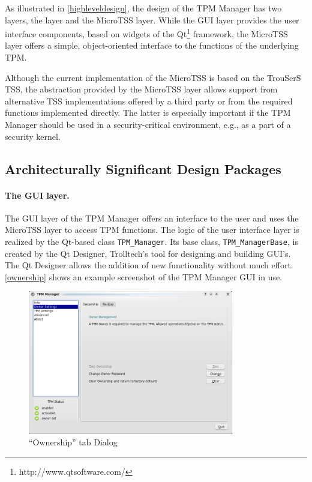 \documentclass[
  american        %
]{sirrixreport}
\begin{document}
As illustrated in \autoref{highleveldesign}, the design of the TPM Manager has two layers, the \GUI layer and the MicroTSS layer.
While the GUI layer provides the user interface components, based on widgets of the Qt\footnote{http://www.qtsoftware.com/} framework, the MicroTSS layer offers a simple, object-oriented interface to the functions
of the underlying TPM.


Although the current implementation of the MicroTSS is based on the TrouSerS TSS, the abstraction provided by the MicroTSS layer allows support from alternative
TSS implementations offered by a third party or from the required functions implemented directly.
The latter is especially important if the TPM Manager should be used in a security-critical
environment, e.g., as a part of a security kernel.


\subsection{Architecturally Significant Design Packages}


\paragraph{The GUI layer.}
The GUI layer of the TPM Manager offers an interface to the user and uses
the MicroTSS layer to access TPM functions. The logic of the user interface layer is realized by
the Qt-based class \lstinline'TPM_Manager'. Its base class, \lstinline'TPM_ManagerBase', is created by the
Qt Designer, Trolltech's tool for designing and building GUI's. The
Qt Designer allows the addition of new functionality without much effort. \autoref{ownership} shows an
example screenshot of the TPM Manager GUI in use.

\begin{figure}[h]
 \centering
 \includegraphics[width=0.8\textwidth]{images/tpm_ownership}
 \caption{``Ownership'' tab Dialog}
 \label{ownership}
\end{figure}
\clearpage
\end{document}
